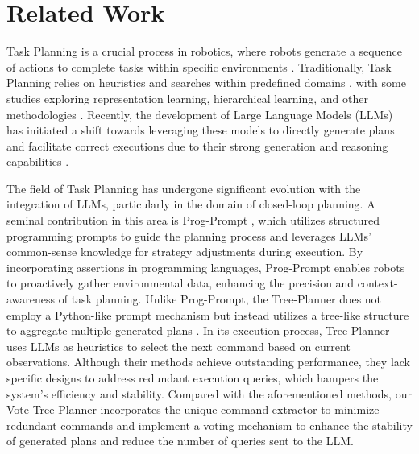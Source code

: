 \section{Related Work}
Task Planning is a crucial process in robotics, where robots generate a sequence of actions to complete tasks within specific environments \cite{Kaelbling2011}. Traditionally, Task Planning relies on heuristics and searches within predefined domains \cite{garrett2020pddlstream, jiang2019task}, with some studies exploring representation learning, hierarchical learning, and other methodologies \cite{eysenbach2019search, xu2018neural, zhang2023cat}. Recently, the development of Large Language Models \cite{brown2020language, chen2021evaluating} (LLMs) has initiated a shift towards leveraging these models to directly generate plans and facilitate correct executions due to their strong generation and reasoning capabilities \cite{chu2023timebench, gramopadhye2023generating, valmeekam2023planbench}.

The field of Task Planning has undergone significant evolution with the integration of LLMs, particularly in the domain of closed-loop planning. A seminal contribution in this area is Prog-Prompt \cite{singh2022progprompt}, which utilizes structured programming prompts to guide the planning process and leverages LLMs' common-sense knowledge for strategy adjustments during execution. By incorporating assertions in programming languages, Prog-Prompt enables robots to proactively gather environmental data, enhancing the precision and context-awareness of task planning. Unlike Prog-Prompt, the Tree-Planner does not employ a Python-like prompt mechanism but instead utilizes a tree-like structure to aggregate multiple generated plans \cite{hu2023treeplanner}. In its execution process, Tree-Planner uses LLMs as heuristics to select the next command based on current observations. Although their methods achieve outstanding performance, they lack specific designs to address redundant execution queries, which hampers the system's efficiency and stability. Compared with the aforementioned methods, our Vote-Tree-Planner incorporates the unique command extractor to minimize redundant commands and implement a voting mechanism to enhance the stability of generated plans and reduce the number of queries sent to the LLM.